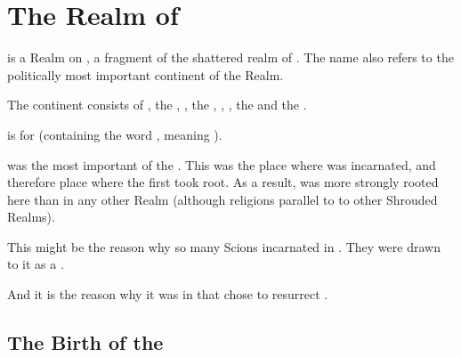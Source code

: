 
\part{The Realm of \Azmith}
\index{\Azmith}
\Azmith{} is a Realm on \Miith{}, a fragment of the shattered realm of \Tembrae. 
The name \quo{\Azmith} also refers to the politically most important continent of the Realm. 

The continent consists of , the , , the , , , the  and the . %

\quo{\Azmith} is  for  (containing the word \quo{\Miith}, meaning ). 

\Azmith was the most important of the . 
This was the place where  was incarnated, and therefore place where the  first took root. 
As a result, \iquin was more strongly rooted here than in any other Realm (although religions parallel to   to other Shrouded Realms). 

This might be the reason why so many Scions incarnated in \Azmith. 
They were drawn to it as a . 

And it is the reason why it was in \Azmith{} that \Secherdamon{} chose to resurrect \Nithdornazsh. 








































\chapter{The Birth of the \VaimonCaliphate}















